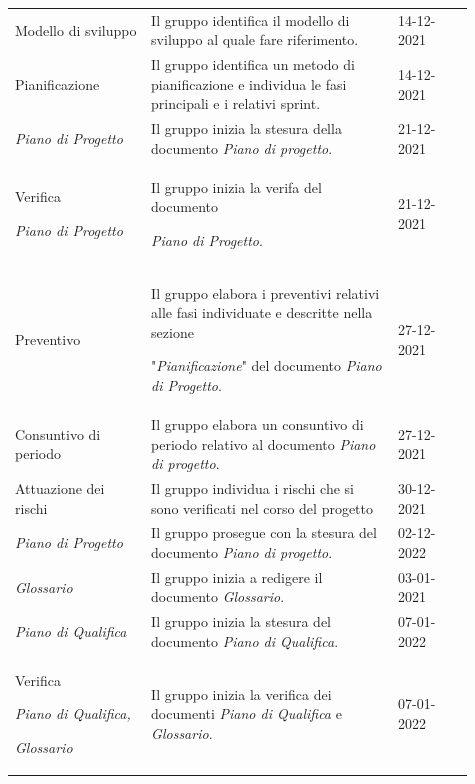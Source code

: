 {\begin{longtable}{p{0.27\linewidth}p{0.49\linewidth}p{0.15\linewidth}}
    \rowcolor[RGB]{216, 235, 171}
    Modello di sviluppo & Il gruppo identifica il modello di sviluppo al quale fare riferimento. & 14-12-2021\\

    \rowcolor[RGB]{233, 245, 206}
    Pianificazione & Il gruppo identifica un metodo di pianificazione e individua le fasi principali e i relativi sprint. & 14-12-2021\\

    \rowcolor[RGB]{216, 235, 171}
    \textit{Piano di Progetto} & Il gruppo inizia la stesura della documento \textit{Piano di progetto}. & 21-12-2021\\

    \rowcolor[RGB]{233, 245, 206}
    Verifica \par \textit{Piano di Progetto} & Il gruppo inizia la verifa del documento \par \textit{Piano di Progetto}. & 21-12-2021\\

    \rowcolor[RGB]{216, 235, 171}
    Preventivo & Il gruppo elabora i preventivi relativi alle fasi individuate e descritte nella sezione \par "\textit{Pianificazione}" del documento \textit{Piano di Progetto}. & 27-12-2021\\

    \rowcolor[RGB]{233, 245, 206}
    Consuntivo di periodo & Il gruppo elabora un consuntivo di periodo relativo al documento \textit{Piano di progetto}. & 27-12-2021\\

    \rowcolor[RGB]{216, 235, 171}
    Attuazione dei rischi & Il gruppo individua i rischi che si sono verificati nel corso del progetto & 30-12-2021\\

    \rowcolor[RGB]{233, 245, 206}
    \textit{Piano di Progetto} & Il gruppo prosegue con la stesura del documento \textit{Piano di progetto}. & 02-12-2022\\
    
    \rowcolor[RGB]{216, 235, 171}
    \textit{Glossario} & Il gruppo inizia a redigere il documento \textit{Glossario}. & 03-01-2021\\

    \rowcolor[RGB]{233, 245, 206}
    \textit{Piano di Qualifica} & Il gruppo inizia la stesura del documento \textit{Piano di Qualifica}. & 07-01-2022\\

    \rowcolor[RGB]{216, 235, 171}
    Verifica \par \textit{Piano di Qualifica,} \par \textit{Glossario} & Il gruppo inizia la verifica dei documenti \textit{Piano di Qualifica} e \textit{Glossario}. & 07-01-2022\\


\end{longtable}}
